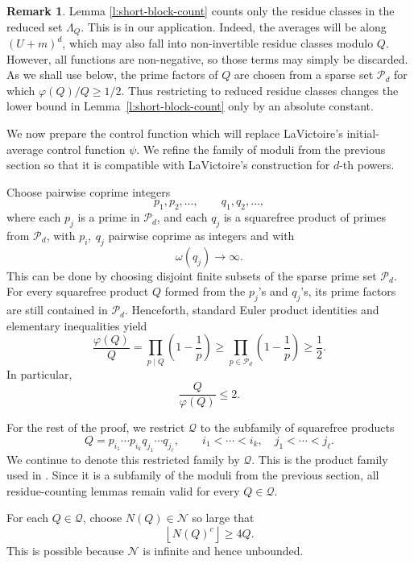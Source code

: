 \documentclass[12pt,leqno]{amsart}
\newcounter{counter}
\newcounter{counter2}
\numberwithin{equation}{section}
\numberwithin{counter2}{section}
\newcounter{theorem}
\theoremstyle{definition}
\newtheorem{remark}[subsection]{Remark}
\theoremstyle{plain}
\newcommand{\floor}[1]{\left\lfloor #1 \right\rfloor}
\begin{document}
\begin{remark}
Lemma \ref{l:short-block-count} counts only the residue classes in the reduced set \(\Lambda_Q\).
This is in our application.  Indeed, the averages will be along
\((U+m)^d\), which may also fall into non-invertible residue classes modulo
\(Q\). However, all functions are non-negative, so those terms may simply be
discarded.  As we shall use below, the prime factors of \(Q\) are chosen from a sparse set
\(\mathcal P_d\) for which $\varphi(Q)/Q \ge  1/2$.
Thus restricting to reduced residue classes changes the lower bound in
Lemma~\ref{l:short-block-count} only by an absolute constant.
\end{remark}

\bigskip

We now prepare the control function which will replace LaVictoire's
initial-average control function \(\psi\).
We refine the family of moduli from the previous section so
that it is compatible with LaVictoire's construction for \(d\)-th powers.

Choose pairwise coprime integers
\[
p_1,p_2,\dots,
\qquad
q_1,q_2,\dots,
\]
where each \(p_j\) is a prime in \(\mathcal P_d\), and each \(q_j\) is a
squarefree product of primes from \(\mathcal P_d\), with $p_i,\ q_j$
pairwise coprime as integers and with
\[
\omega(q_j)\to\infty .
\]
This can be done by choosing disjoint finite subsets of the sparse prime set
\(\mathcal P_d\). For every squarefree product \(Q\) formed from the \(p_j\)'s
and \(q_j\)'s, its prime factors are still contained in \(\mathcal P_d\). Henceforth, standard Euler product identities and elementary inequalities yield
\[
\frac{\varphi(Q)}{Q}
=
\prod_{p\mid Q}\left(1-\frac1p\right)
\geq
\prod_{p\in\mathcal P_d}\left(1-\frac1p\right)
\geq
\frac12.
\]
In particular,
\[
\frac{Q}{\varphi(Q)}\leq 2.
\]

For the rest of the proof, we restrict \(\mathcal Q\) to the subfamily of
squarefree products
\[
Q=p_{i_1}\cdots p_{i_k}q_{j_1}\cdots q_{j_\ell},
\qquad
i_1<\cdots<i_k,\quad j_1<\cdots<j_\ell .
\]
We continue to denote this restricted family by \(\mathcal Q\). This is the
product family used in \cite[Proposition~4.1]{L9}. Since it is a subfamily of
the moduli from the previous section, all residue-counting lemmas remain valid
for every \(Q\in\mathcal Q\).

For each \(Q\in\mathcal Q\), choose \(N(Q)\in\mathcal N\) so large that
\[
\floor{N(Q)^c}\geq 4Q
.
\]
This is possible because \(\mathcal N\) is infinite and hence unbounded.
\end{document}
